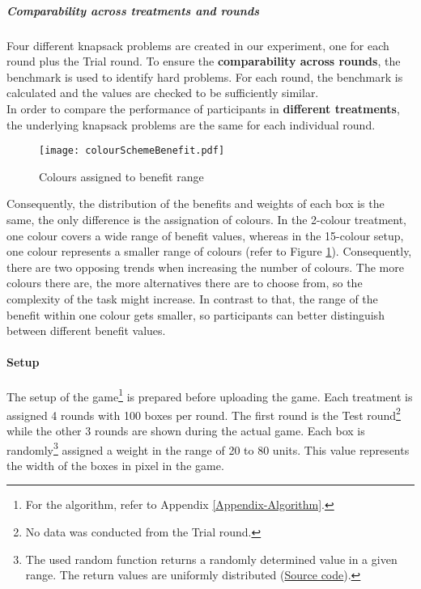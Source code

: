 \subparagraph{Comparability across treatments and rounds}
Four different knapsack problems are created in our experiment, one for each round plus the Trial round. To ensure the \textbf{comparability across rounds}, the benchmark is used to identify hard problems. For each round, the benchmark is calculated and the values are checked to be sufficiently similar.\\ 
In order to compare the performance of participants in \textbf{different treatments}, the underlying knapsack problems are the same for each individual round.
 \begin{figure}[htp] %
\begin{center}
  \texttt{[image: colourSchemeBenefit.pdf]}
\caption{Colours assigned to benefit range}
\label{fig:colourSchemeBenefit}
\end{center}
\end{figure}
Consequently, the distribution of the benefits and weights of each box is the same, the only difference is the assignation of colours. In the 2-colour treatment, one colour covers a wide range of benefit values, whereas in the 15-colour setup, one colour represents a smaller range of colours (refer to Figure \ref{fig:colourSchemeBenefit}).  Consequently, there are two opposing trends when increasing the number of colours. The more colours there are, the more alternatives there are to choose from, so the complexity of the task might increase. In contrast to that, the range of the benefit within one colour gets smaller, so participants can better distinguish between different benefit values.

\paragraph{Setup}
\label{ch:Experiment:sec:Setup}

The setup of the game\footnote{For the algorithm, refer to Appendix \ref{Appendix-Algorithm}.} is prepared before uploading the game. 
Each treatment is assigned 4 rounds with 100 boxes per round. The first round is the Test round\footnote{No data was conducted from the Trial round.} while the other 3 rounds are shown during the actual game.
Each box is randomly\footnote{The used random function returns a randomly determined value in a given range. The return values are uniformly distributed (\href{http://hg.python.org/cpython/file/2.7/Lib/random.py}{Source code}).} assigned a weight in the range of 20 to 80 units. This value represents the width of the boxes in pixel in the game.




